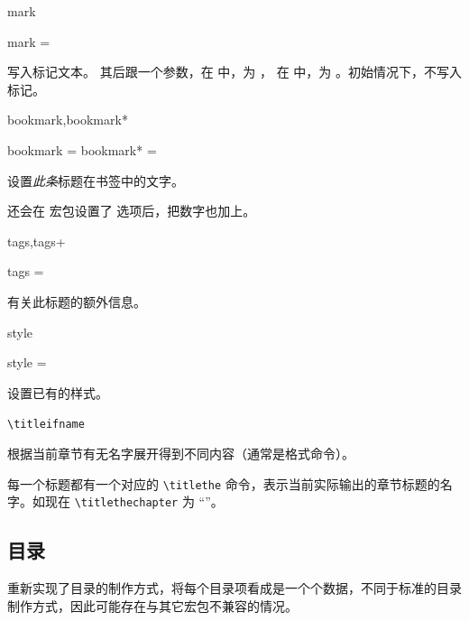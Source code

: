 \documentclass[twoside]{book}
\begin{document}
\begin{keyval}[path=title/...]{mark}
  \begin{syntax}
    mark = 
  \end{syntax}
写入标记文本。 其后跟一个参数，在  中，为 ，
在  中，为 。初始情况下，不写入标记。
\end{keyval}

\begin{keyval}[path=title/...]{bookmark,bookmark*}
  \begin{syntax}
    bookmark  = 
    bookmark* = 
  \end{syntax}
设置\emph{此条}标题在书签中的文字。

 还会在  宏包设置了  选项后，把数字也加上。
\end{keyval}

\begin{keyval}[path=title/...]{tags,tags+}
  \begin{syntax}
    tags = 
  \end{syntax}
有关此标题的额外信息。
\end{keyval}  

\begin{keyval}[path=title/...]{style}
  \begin{syntax}
    style = 
  \end{syntax}
设置已有的样式。
\end{keyval}

\begin{function}[EXP]{\titleifname}
  \begin{syntax}
    \verb|\titleifname|  
  \end{syntax}
根据当前章节有无名字展开得到不同内容（通常是格式命令）。
\end{function}

每一个标题都有一个对应的 \texttt{\textbackslash titlethe} 命令，表示当前实际输出的章节标题的名字。如现在 \verb|\titlethechapter| 为 “\titlethechapter”。


\subsection{目录}

\CusTeX 重新实现了目录的制作方式，将每个目录项看成是一个个数据，不同于标准的目录制作方式，因此可能存在与其它宏包不兼容的情况。
\end{document}
